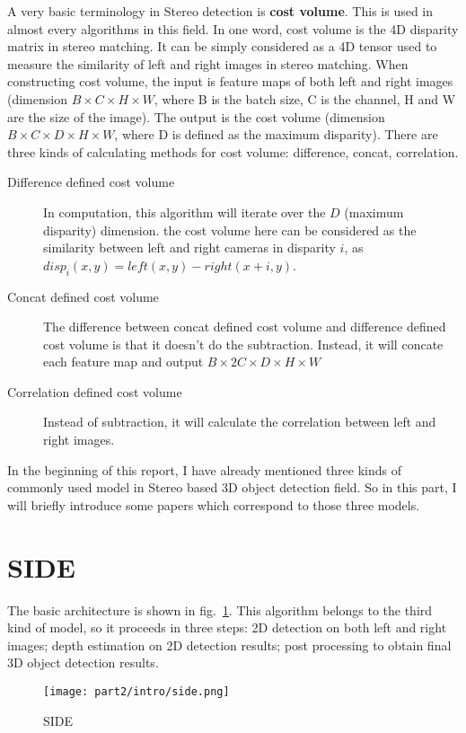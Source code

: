\documentclass[12pt]{article}
\begin{document}
A very basic terminology in Stereo detection is \textbf{cost volume}. This is used in almost every algorithms in this field. In one word, cost volume is the 4D disparity matrix in stereo matching. It can be simply considered as a 4D tensor used to measure the similarity of left and right images in stereo matching. When constructing cost volume, the input is feature maps of both left and right images (dimension $B\times C\times H\times W$, where B is the batch size, C is the channel, H and W are the size of the image). The output is the cost volume (dimension $B\times C\times D \times H\times W$, where D is defined as the maximum disparity). There are three kinds of calculating methods for cost volume: difference, concat, correlation.
\begin{description}
    \item [Difference defined cost volume] In computation, this algorithm will iterate over the $D$ (maximum disparity) dimension. the cost volume here can be considered as the similarity between left and right cameras in disparity $i$, as $disp_i(x,y)=left(x,y)-right(x+i,y)$.
    \item [Concat defined cost volume] The difference between concat defined cost volume and difference defined cost volume is that it doesn't do the subtraction. Instead, it will concate each feature map and output $B\times 2C \times D \times H \times W$
    \item [Correlation defined cost volume] Instead of subtraction, it will calculate the correlation between left and right images.
\end{description}

In the beginning of this report, I have already mentioned three kinds of commonly used model in Stereo based 3D object detection field. So in this part, I will briefly introduce some papers which correspond to those three models.


\section{SIDE\cite{DBLP:journals/corr/abs-2108-09663}}
The basic architecture is shown in fig.~\ref{side}. This algorithm belongs to the third kind of model, so it proceeds in three steps: 2D detection on both left and right images; depth estimation on 2D detection results; post processing to obtain final 3D object detection results. 
\begin{figure}[H]
    \centering
    \texttt{[image: part2/intro/side.png]}
    \caption{SIDE}
    \label{side}
\end{figure}
\end{document}
